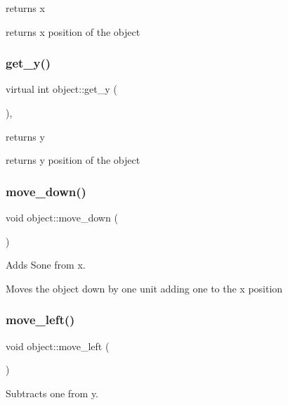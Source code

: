 returns x 

returns x position of the object \mbox{\label{classobject_abc363fe3aa7a4f29b035df6a57695eba}} 
\subsubsection{\texorpdfstring{get\+\_\+y()}{get\_y()}}
{\footnotesize\ttfamily virtual int object\+::get\+\_\+y (\begin{DoxyParamCaption}{ }\end{DoxyParamCaption})\hspace{0.3cm}{\ttfamily [inline]}, {\ttfamily [virtual]}}



returns y 

returns y position of the object \mbox{\label{classobject_a0a8f714e2850552b925383f53c407430}} 
\subsubsection{\texorpdfstring{move\+\_\+down()}{move\_down()}}
{\footnotesize\ttfamily void object\+::move\+\_\+down (\begin{DoxyParamCaption}{ }\end{DoxyParamCaption})}



Adds Sone from x. 

Moves the object down by one unit adding one to the x position \mbox{\label{classobject_a60b38349b8faad4c9e41f08df2c41428}} 
\subsubsection{\texorpdfstring{move\+\_\+left()}{move\_left()}}
{\footnotesize\ttfamily void object\+::move\+\_\+left (\begin{DoxyParamCaption}{ }\end{DoxyParamCaption})}



Subtracts one from y. 

